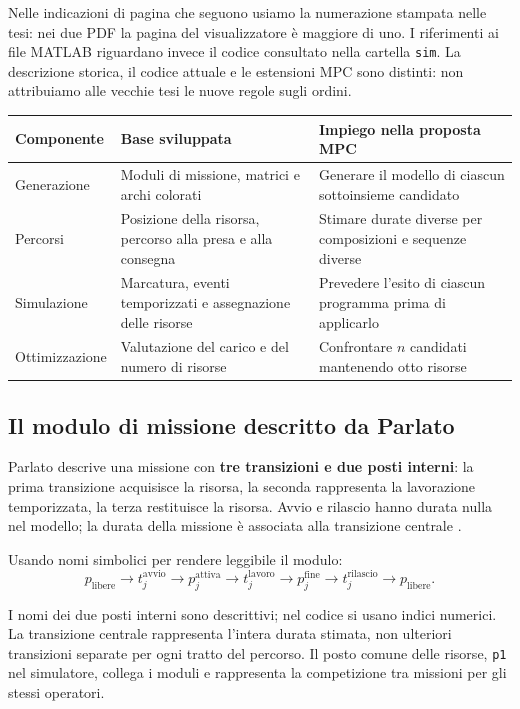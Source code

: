 \documentclass[a4paper,11pt]{article}
\begin{document}
Nelle indicazioni di pagina che seguono usiamo la numerazione stampata nelle tesi: nei due PDF la pagina del visualizzatore è maggiore di uno. I riferimenti ai file MATLAB riguardano invece il codice consultato nella cartella \texttt{sim}. La descrizione storica, il codice attuale e le estensioni MPC sono distinti: non attribuiamo alle vecchie tesi le nuove regole sugli ordini.

\begin{center}
\small
\begin{tabularx}{\linewidth}{@{}p{2.4cm}XX@{}}
\toprule
Componente & Base sviluppata & Impiego nella proposta MPC\\
\midrule
Generazione & Moduli di missione, matrici e archi colorati & Generare il modello di ciascun sottoinsieme candidato\\
Percorsi & Posizione della risorsa, percorso alla presa e alla consegna & Stimare durate diverse per composizioni e sequenze diverse\\
Simulazione & Marcatura, eventi temporizzati e assegnazione delle risorse & Prevedere l'esito di ciascun programma prima di applicarlo\\
Ottimizzazione & Valutazione del carico e del numero di risorse & Confrontare $n$ candidati mantenendo otto risorse\\
\bottomrule
\end{tabularx}
\end{center}

\subsection{Il modulo di missione descritto da Parlato}

Parlato descrive una missione con \textbf{tre transizioni e due posti interni}: la prima transizione acquisisce la risorsa, la seconda rappresenta la lavorazione temporizzata, la terza restituisce la risorsa. Avvio e rilascio hanno durata nulla nel modello; la durata della missione è associata alla transizione centrale \cite[sezione 2.3.2, pp. 19--22, figure 2.5--2.8]{Parlato}.

Usando nomi simbolici per rendere leggibile il modulo:
\[
 p_{\mathrm{libere}}
 \longrightarrow t_j^{\mathrm{avvio}}
 \longrightarrow p_j^{\mathrm{attiva}}
 \longrightarrow t_j^{\mathrm{lavoro}}
 \longrightarrow p_j^{\mathrm{fine}}
 \longrightarrow t_j^{\mathrm{rilascio}}
 \longrightarrow p_{\mathrm{libere}}.
\]

I nomi dei due posti interni sono descrittivi; nel codice si usano indici numerici. La transizione centrale rappresenta l'intera durata stimata, non ulteriori transizioni separate per ogni tratto del percorso. Il posto comune delle risorse, \texttt{p1} nel simulatore, collega i moduli e rappresenta la competizione tra missioni per gli stessi operatori.
\end{document}
